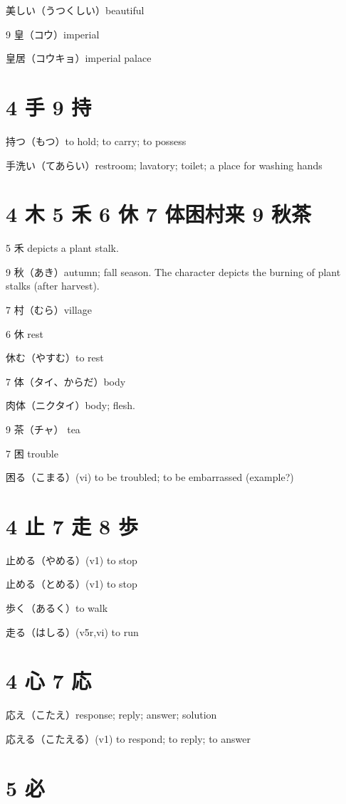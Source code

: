 美しい（うつくしい）beautiful

9 皇（コウ）imperial

皇居（コウキョ）imperial palace

\section{4 手 9 持}

持つ（もつ）to hold; to carry; to possess

手洗い（てあらい）restroom; lavatory; toilet; a place for washing hands

\section{4 木 5 禾 6 休 7 体困村来 9 秋茶}

5 禾 depicts a plant stalk.

9 秋（あき）autumn; fall season.
The character depicts the burning of plant stalks (after harvest).

7 村（むら）village

6 休 rest

休む（やすむ）to rest

7 体（タイ、からだ）body

肉体（ニクタイ）body; flesh.

9 茶（チャ） tea

7 困 trouble

困る（こまる）(vi) to be troubled; to be embarrassed
(example?)

\section{4 止 7 走 8 歩}

止める（やめる）(v1) to stop

止める（とめる）(v1) to stop

歩く（あるく）to walk

走る（はしる）(v5r,vi) to run

\section{4 心 7 応}

応え（こたえ）response; reply; answer; solution

応える（こたえる）(v1) to respond; to reply; to answer

\section{5 必}

